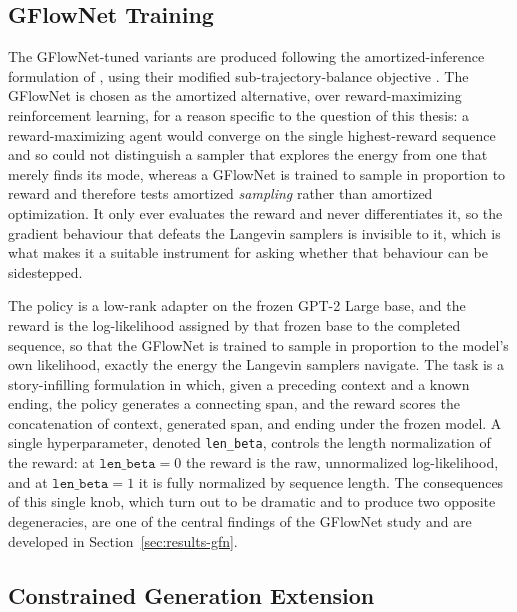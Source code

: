 \subsection{GFlowNet Training}
\label{sec:meth-gfn}

The GFlowNet-tuned variants are produced following the amortized-inference formulation of \citet{hu2024amortizing}, using their modified sub-trajectory-balance objective \citep{malkin2022trajectory, madan2023learning}. The GFlowNet is chosen as the amortized alternative, over reward-maximizing reinforcement learning, for a reason specific to the question of this thesis: a reward-maximizing agent would converge on the single highest-reward sequence and so could not distinguish a sampler that explores the energy from one that merely finds its mode, whereas a GFlowNet is trained to sample in proportion to reward and therefore tests amortized \emph{sampling} rather than amortized optimization. It only ever evaluates the reward and never differentiates it, so the gradient behaviour that defeats the Langevin samplers is invisible to it, which is what makes it a suitable instrument for asking whether that behaviour can be sidestepped.

The policy is a low-rank adapter \citep{hu2022lora} on the frozen GPT-2 Large base, and the reward is the log-likelihood assigned by that frozen base to the completed sequence, so that the GFlowNet is trained to sample in proportion to the model's own likelihood, exactly the energy the Langevin samplers navigate. The task is a story-infilling formulation in which, given a preceding context and a known ending, the policy generates a connecting span, and the reward scores the concatenation of context, generated span, and ending under the frozen model. A single hyperparameter, denoted \texttt{len\_beta}, controls the length normalization of the reward: at $\texttt{len\_beta}=0$ the reward is the raw, unnormalized log-likelihood, and at $\texttt{len\_beta}=1$ it is fully normalized by sequence length. The consequences of this single knob, which turn out to be dramatic and to produce two opposite degeneracies, are one of the central findings of the GFlowNet study and are developed in Section~\ref{sec:results-gfn}.

\subsection{Constrained Generation Extension}
\label{sec:meth-constrained}

